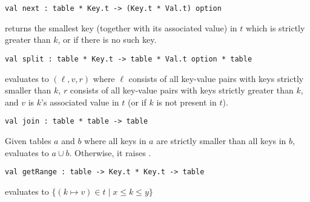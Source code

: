 \begin{cluster}
\label{grp:grm:aug-ordtable-interface::next}

\begin{gram}[next]
\label{grm:aug-ordtable-interface::next}
\begin{verbatim}
val next : table * Key.t -> (Key.t * Val.t) option
\end{verbatim}
 returns the smallest key (together with its associated value)
in $t$
which is strictly greater than $k$, or  if there is no such key.

\end{gram}
\end{cluster}

\begin{cluster}
\label{grp:grm:aug-ordtable-interface::split}

\begin{gram}[split]
\label{grm:aug-ordtable-interface::split}
\begin{verbatim}
val split : table * Key.t -> table * Val.t option * table
\end{verbatim}
 evaluates to $(\ell, v, r)$ where $\ell$ consists of all
key-value pairs with keys strictly smaller than $k$, $r$ consists of all key-value
pairs with keys strictly greater than $k$, and $v$ is $k$'s associated value
in $t$ (or  if $k$ is not present in $t$).

\end{gram}
\end{cluster}

\begin{cluster}
\label{grp:grm:aug-ordtable-interface::join}

\begin{gram}[join]
\label{grm:aug-ordtable-interface::join}
\begin{verbatim}
val join : table * table -> table
\end{verbatim}
Given tables $a$ and $b$ where all keys in $a$ are strictly smaller than all
keys in $b$,  evaluates to $a \cup b$. Otherwise, it raises
.

\end{gram}
\end{cluster}

\begin{cluster}
\label{grp:grm:aug-ordtable-interface::getrange}

\begin{gram}[getRange]
\label{grm:aug-ordtable-interface::getrange}
\begin{verbatim}
val getRange : table -> Key.t * Key.t -> table
\end{verbatim}
 evaluates to $\{(k \mapsto v) \in t \mathbin| x \leq k \leq y\}$

\end{gram}
\end{cluster}

